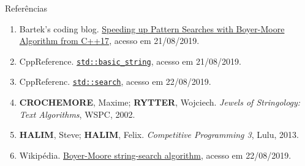 \begin{frame}[fragile]{Referências}

    \begin{enumerate}
        \item Bartek's coding blog. \href{https://www.bfilipek.com/2018/08/searchers.html}{Speeding up Pattern Searches with Boyer-Moore Algorithm from C++17}, acesso em 21/08/2019.

        \item CppReference. \href{https://en.cppreference.com/w/cpp/string/basic_string}{\texttt{std::basic\_string}}, acesso em 21/08/2019.

        \item CppReferenc. \href{https://en.cppreference.com/w/cpp/algorithm/search}{\texttt{std::search}}, acesso em 22/08/2019.

        \item \textbf{CROCHEMORE}, Maxime; \textbf{RYTTER}, Wojciech. \textit{Jewels of Stringology: Text Algorithms}, WSPC, 2002.

        \item \textbf{HALIM}, Steve; \textbf{HALIM}, Felix. \textit{Competitive Programming 3}, Lulu, 2013.

        \item Wikipédia. \href{https://en.wikipedia.org/wiki/Boyer\%E2\%80\%93Moore_string-search_algorithm}{Boyer-Moore string-search algorithm}, acesso em 22/08/2019.
    \end{enumerate}

\end{frame}
